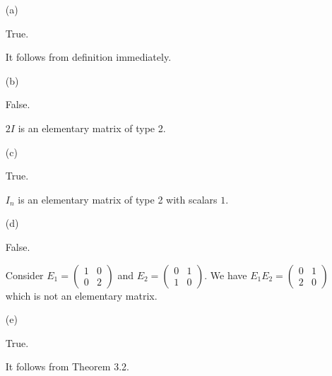 \begin{Exercise}
	\begin{enumerate}[(a)]
		\item[(a)]
		\begin{answer}
			True.
		\end{answer}
		\begin{solution}
			It follows from definition immediately.
		\end{solution}
		
		\item[(b)]
		\begin{answer}
			False.
		\end{answer}
		\begin{solution}
			$2I$ is an elementary matrix of type 2.
		\end{solution}
		
		\item[(c)]
		\begin{answer}
			True.
		\end{answer}
		\begin{solution}
			$I_n$ is an elementary matrix of type 2 with scalars $1$.
		\end{solution}
		
		\item[(d)]
		\begin{answer}
			False.
		\end{answer}
		\begin{solution}
			Consider $E_1 = \begin{pmatrix}
			1 & 0 \\
			0 & 2
			\end{pmatrix}$ and $E_2 = \begin{pmatrix}
			0 & 1 \\
			1 & 0
			\end{pmatrix}$. We have $E_1 E_2 = \begin{pmatrix}
			0 & 1 \\
			2 & 0
			\end{pmatrix}$ which is not an elementary matrix.
		\end{solution}
		
		\item[(e)]
		\begin{answer}
			True.
		\end{answer}
		\begin{solution}
			It follows from Theorem 3.2.
		\end{solution}
		

\end{enumerate}
\end{Exercise}
